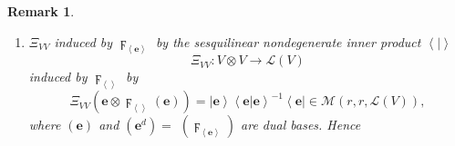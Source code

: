 \documentclass[aps,preprint]{revtex4}%
\newtheorem{remark}[theorem]{Remark}
\begin{document}
\begin{remark}
\begin{enumerate}
\begin{enumerate}
\item
\begin{gather*}
\Xi_{VV^{d}}\left(  A\right)  =\Xi_{VV^{d}}\left(  A\left(  \mathbf{e}\right)
\otimes\left(  \mathbf{e}^{d}\right)  \right)  =\Xi_{VV^{d}}\left(  A\left(
\mathbf{e}\right)  \otimes\left(  \left.  \mathbf{e}\right\vert \mathbf{e}%
\right)  ^{-1}\left(  \mathbf{e}\right\vert \right)  =\Xi_{VV^{d}}\left(
\left(  \mathbf{e}\right)  \mathcal{R}_{e}\left(  A\right)  \otimes\left(
\left.  \mathbf{e}\right\vert \mathbf{e}\right)  ^{-1}\left(  \mathbf{e}%
\right\vert \right)  =\left(  \mathbf{e}\right)  \mathcal{R}_{e}\left(
A\right)  \left(  \left.  \mathbf{e}\right\vert \mathbf{e}\right)
^{-1}\left(  \mathbf{e}\right\vert \\
=\left\vert \mathbf{e}\right)  \mathcal{R}_{e}\left(  A\right)  \left(
\left.  \mathbf{e}\right\vert \mathbf{e}\right)  ^{-1}\left(  \mathbf{e}%
\right\vert =\left\vert \mathbf{e}\right)  \left(  \left.  \mathbf{e}%
\right\vert \mathbf{e}\right)  ^{-1}\mathcal{M}_{\left\vert e\right)  }\left(
A\right)  \left(  \left.  \mathbf{e}\right\vert \mathbf{e}\right)
^{-1}\left(  \mathbf{e}\right\vert =A.
\end{gather*}


\item
\begin{equation}
\mathcal{M}_{\left\vert e\right)  }\left(  A\right)  =\left(  \left.
\mathbf{e}\right\vert A\mathbf{e}\right)  =\left(  \left.  \mathbf{e}%
\right\vert \mathbf{e}\right)  \mathcal{R}_{e}\left(  A\right)  \left(
\left.  \mathbf{e}\right\vert \mathbf{e}\right)  ^{-1}\left(  \left.
\mathbf{e}\right\vert \mathbf{e}\right)  =\left(  \left.  \mathbf{e}%
\right\vert \mathbf{e}\right)  \mathcal{R}_{e}\left(  A\right)  .
\end{equation}

\end{enumerate}

\item $\Xi_{VV}$ induced by $\digamma_{\left\langle \mathbf{e}\right\rangle }$
by the sesquilinear nondegenerate inner product $\left\langle \left.
{}\right\vert \right\rangle $
\begin{equation}
\Xi_{VV}:V\otimes V\rightarrow\mathcal{L}\left(  V\right)
\end{equation}
induced by $\digamma_{\left\langle {}\right\rangle }$ by
\begin{equation}
\Xi_{VV}\left(  \mathbf{e}\otimes\digamma_{\left\langle {}\right\rangle
}\left(  \mathbf{e}\right)  \right)  =\left\vert \mathbf{e}\right\rangle
\left\langle \left.  \mathbf{e}\right\vert \mathbf{e}\right\rangle
^{-1}\left\langle \mathbf{e}\right\vert \in\mathcal{M}\left(  r,r,\mathcal{L}%
\left(  V\right)  \right)  ,
\end{equation}
where $\left(  \mathbf{e}\right)  $ and $\left(  \mathbf{e}^{d}\right)  =$
$\left(  \digamma_{\left\langle \mathbf{e}\right\rangle }\right)  $ are dual
bases. Hence


\end{enumerate}
\end{remark}
\end{document}
